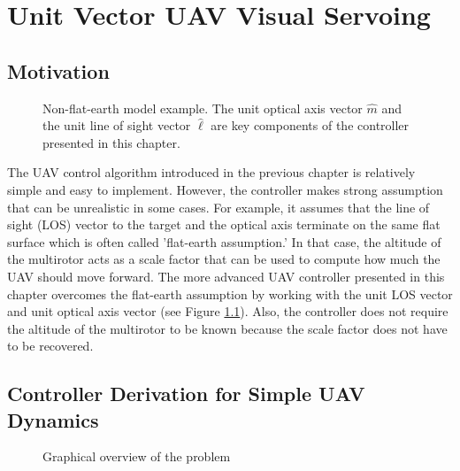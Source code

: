 \chapter{Unit Vector UAV Visual Servoing}
\label{chapter4}
\section{Motivation}
\begin{figure}[htbp]
	\centering
	\caption{Non-flat-earth model example. The unit optical axis vector $\hat{m}$ and the unit line of sight vector $\hat{\ell}$ are key components of the controller presented in this chapter.}
	\label{nonflatearth}
\end{figure}
The UAV control algorithm introduced in the previous chapter is relatively simple and easy to implement. However, the controller makes strong assumption that can be unrealistic in some cases. For example, it assumes that the line of sight (LOS) vector to the target and the optical axis terminate on the same flat surface which is often called 'flat-earth assumption.' In that case, the altitude of the multirotor acts as a scale factor that can be used to compute how much the UAV should move forward. The more advanced UAV controller presented in this chapter overcomes the flat-earth assumption by working with the unit LOS vector and unit optical axis vector (see Figure \ref{nonflatearth}). Also, the controller does not require the altitude of the multirotor to be known because the scale factor does not have to be recovered.

\section{Controller Derivation for Simple UAV Dynamics}
\begin{figure}[htbp]
	\centering
	\caption{Graphical overview of the problem}
	\label{overview}
\end{figure}

